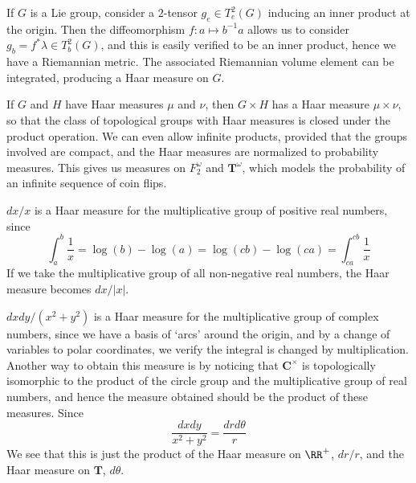 \begin{example}
    If $G$ is a Lie group, consider a $2$-tensor $g_e \in T^2_e(G)$ inducing an inner product at the origin. Then the diffeomorphism $f: a \mapsto b^{-1}a$ allows us to consider $g_b = f^* \lambda \in T^2_b(G)$, and this is easily verified to be an inner product, hence we have a Riemannian metric. The associated Riemannian volume element can be integrated, producing a Haar measure on $G$.
\end{example}

\begin{example}
    If $G$ and $H$ have Haar measures $\mu$ and $\nu$, then $G \times H$ has a Haar measure $\mu \times \nu$, so that the class of topological groups with Haar measures is closed under the product operation. We can even allow infinite products, provided that the groups involved are compact, and the Haar measures are normalized to probability measures. This gives us measures on $F_2^\omega$ and $\mathbf{T}^\omega$, which models the probability of an infinite sequence of coin flips.
\end{example}

\begin{example}
    $dx/x$ is a Haar measure for the multiplicative group of positive real numbers, since
    \[ \int_a^b \frac{1}{x} = \log(b) - \log(a) = \log(cb) - \log(ca) = \int_{ca}^{cb} \frac{1}{x} \]
    If we take the multiplicative group of all non-negative real numbers, the Haar measure becomes $dx/|x|$.
\end{example}

\begin{example}
    $dx dy/(x^2 + y^2)$ is a Haar measure for the multiplicative group of complex numbers, since we have a basis of `arcs' around the origin, and by a change of variables to polar coordinates, we verify the integral is changed by multiplication. Another way to obtain this measure is by noticing that $\mathbf{C}^\times$ is topologically isomorphic to the product of the circle group and the multiplicative group of real numbers, and hence the measure obtained should be the product of these measures. Since
    \[ \frac{dx dy}{x^2 + y^2} = \frac{dr d\theta}{r} \]
    We see that this is just the product of the Haar measure on $\RR^+$, $dr/r$, and the Haar measure on $\mathbf{T}$, $d \theta$.
\end{example}

